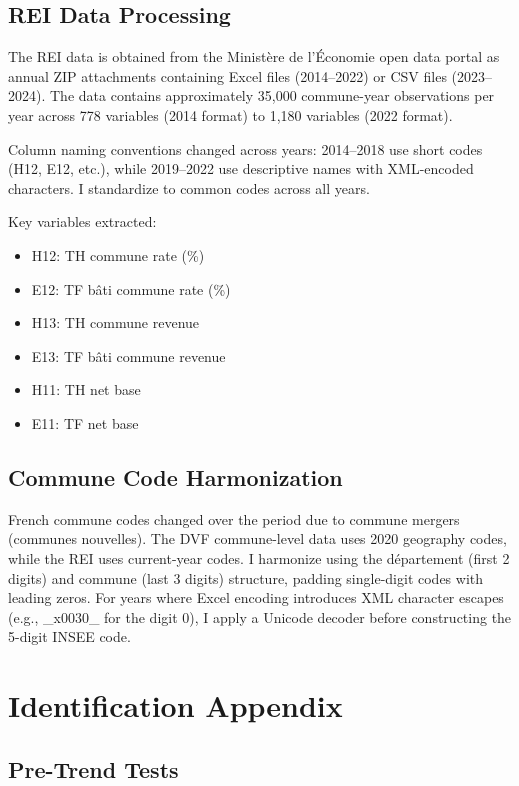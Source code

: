 \documentclass[12pt]{article}
\begin{document}
\subsection{REI Data Processing}

The REI data is obtained from the Minist\`ere de l'\'Economie open data portal as annual ZIP attachments containing Excel files (2014--2022) or CSV files (2023--2024). The data contains approximately 35,000 commune-year observations per year across 778 variables (2014 format) to 1,180 variables (2022 format).

Column naming conventions changed across years: 2014--2018 use short codes (H12, E12, etc.), while 2019--2022 use descriptive names with XML-encoded characters. I standardize to common codes across all years.

Key variables extracted:
\begin{itemize}
\item H12: TH commune rate (\%)
\item E12: TF bâti commune rate (\%)
\item H13: TH commune revenue
\item E13: TF bâti commune revenue
\item H11: TH net base
\item E11: TF net base
\end{itemize}

\subsection{Commune Code Harmonization}

French commune codes changed over the period due to commune mergers (communes nouvelles). The DVF commune-level data uses 2020 geography codes, while the REI uses current-year codes. I harmonize using the département (first 2 digits) and commune (last 3 digits) structure, padding single-digit codes with leading zeros. For years where Excel encoding introduces XML character escapes (e.g., \_x0030\_ for the digit 0), I apply a Unicode decoder before constructing the 5-digit INSEE code.


\section{Identification Appendix}

\subsection{Pre-Trend Tests}
\end{document}
